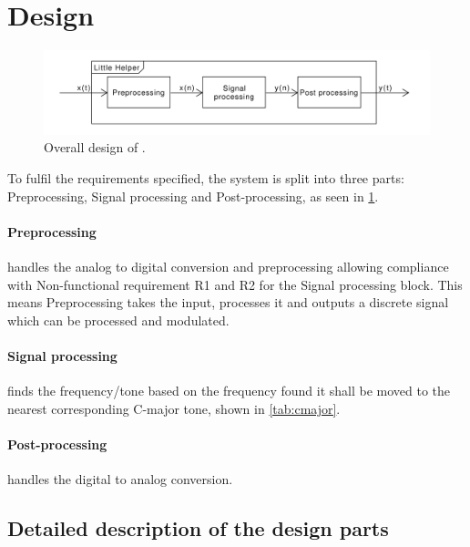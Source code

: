 
\section{Design}
\label{ch:Design}
\begin{figure}
	\centering
	\includegraphics[width=1\linewidth]{gfx/Design/OverallDesign.pdf}
	\caption{Overall design of \systemName.}
	\label{fig:overalldesign}
\end{figure}

To fulfil the requirements specified, the system is split into three parts: Preprocessing, Signal processing and Post-processing, as seen in \cref{fig:overalldesign}.

\paragraph{Preprocessing} handles the analog to digital conversion and preprocessing allowing compliance with Non-functional requirement R1 and R2 for the Signal processing block.
This means Preprocessing takes the input, processes it and outputs a discrete signal which can be processed and modulated.

\paragraph{Signal processing} finds the frequency/tone based on the frequency found it shall be moved to the nearest corresponding C-major tone, shown in \cref{tab:cmajor}.

\paragraph{Post-processing} handles the digital to analog conversion.

\subsection{Detailed description of the design parts}
